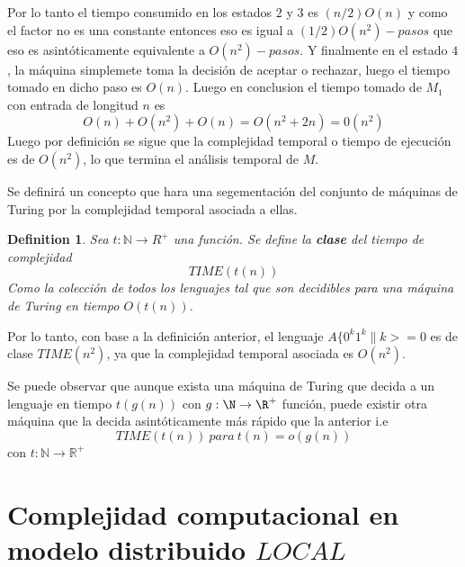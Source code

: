 \documentclass[10pt]{report}
\newtheorem{definition}{Definition}
\begin{document}
    Por lo tanto el tiempo consumido en los estados 2 y 3 es $(n/2)O(n)$ y como el factor no es una constante entonces eso
    es igual a $(1/2)O(n^{2})-pasos$ que eso es asintóticamente equivalente a $O(n^{2})-pasos$.
    Y finalmente en el estado $4$, la máquina simplemete toma la decisión de aceptar o rechazar,
    luego el tiempo tomado en dicho paso es $O(n)$.
    \newline
    Luego en conclusion el tiempo tomado de $M_{1}$ con entrada de longitud $n$ es
    \begin{equation}
        O(n) + O(n^{2}) + O(n) = O(n^{2}+2n) = 0(n^{2})\label{eq:equation10}
    \end{equation}
    Luego por definición se sigue que la complejidad temporal o tiempo de ejecución es de $O(n^{2})$,
    lo que termina el análisis temporal de $M$.\newline

    Se definirá un concepto que hara una segementación del conjunto de máquinas de Turing por la complejidad temporal
    asociada a ellas.
    \begin{definition}
       Sea $t:\mathbb{N} \rightarrow R^{+}$ una función.\newline
        Se define la \textbf{clase} del tiempo de complejidad
        \begin{equation}
            TIME(t(n))\label{eq:equation11}
        \end{equation}
        Como la colección de todos los lenguajes tal que son decidibles para una máquina
        de Turing en tiempo $O(t(n))$.
    \end{definition}
    Por lo tanto, con base a la definición anterior, el lenguaje $A\{0^{k}1^{k}\| k>=0$ es de clase $TIME(n^{2})$,
    ya que la complejidad temporal asociada es $O(n^{2})$.\newline

    Se puede observar que aunque exista una máquina de Turing que decida a un lenguaje en tiempo $t(g(n))$ con
    $g:\N\rightarrow \R^{+}$ función, puede existir otra máquina que la decida asintóticamente más rápido que la anterior
    i.e
    \begin{equation}
        TIME(t(n)) \ para \ t(n)=o(g(n))\label{eq:equation9}
    \end{equation}
    con $t:\mathbb{N}\rightarrow \mathbb{R}^{+}$

    \section{Complejidad computacional en modelo distribuido $LOCAL$}\label{sec:complejidad-computacional-en-modelo-distribuido-$local$}
\end{document}

